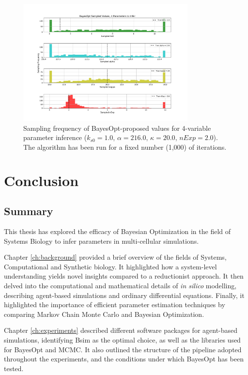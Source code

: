 \documentclass[bsc,frontabs,singlespacing,parskip,deptreport]{infthesis}
\begin{document}
\begin{figure}[H]
    \centering
    \includegraphics[width=0.8\textwidth]{Images/Multiple variables/Histogram_4var.pdf}
    \caption{Sampling frequency of BayesOpt-proposed values for 4-variable parameter inference ($k_{s0} = 1.0$, $\alpha=216.0$, $\kappa=20.0$, $nExp = 2.0$). The algorithm has been run for a fixed number (1,000) of iterations.}
    \label{fig:4var_histogram}
\end{figure}

\chapter{Conclusion}\label{ch:conclusion}
\section{Summary}
This thesis has explored the efficacy of Bayesian Optimization in the field of Systems Biology to infer parameters in multi-cellular simulations.

Chapter \ref{ch:background} provided a brief overview of the fields of Systems, Computational and Synthetic biology. It highlighted how a system-level understanding yields novel insights compared to a reductionist approach. It then delved into the computational and mathematical details of \textit{in silico} modelling, describing agent-based simulations and ordinary differential equations. Finally, it highlighted the importance of efficient parameter estimation techniques by comparing Markov Chain Monte Carlo and Bayesian Optimization.

Chapter \ref{ch:experiments} described different software packages for agent-based simulations, identifying Bsim as the optimal choice, as well as the libraries used for BayesOpt and MCMC. It also outlined the structure of the pipeline adopted throughout the experiments, and the conditions under which BayesOpt has been tested.
\end{document}
